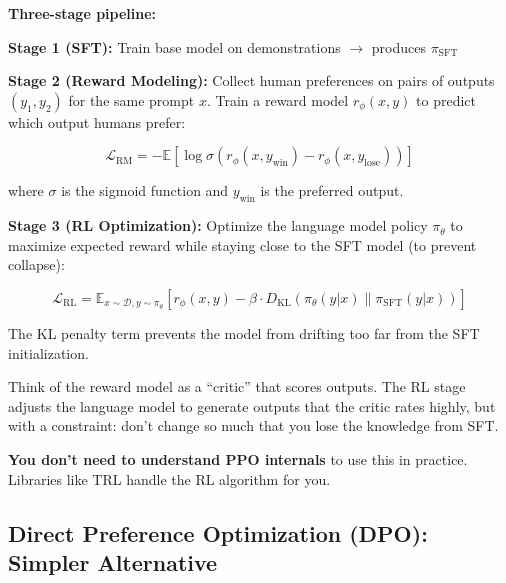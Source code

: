 \documentclass{article}
\begin{document}
\textbf{Three-stage pipeline:}

\begin{center}
\end{center}

\textbf{Stage 1 (SFT):} Train base model on demonstrations $\rightarrow$ produces $\pi_{\text{SFT}}$

\textbf{Stage 2 (Reward Modeling):} Collect human preferences on pairs of outputs $(y_1, y_2)$ for the same prompt $x$. Train a reward model $r_\phi(x, y)$ to predict which output humans prefer:

\begin{equation}
\mathcal{L}_{\text{RM}} = -\mathbb{E} \left[ \log \sigma\left(r_\phi(x, y_{\text{win}}) - r_\phi(x, y_{\text{lose}})\right) \right]
\end{equation}

where $\sigma$ is the sigmoid function and $y_{\text{win}}$ is the preferred output.

\textbf{Stage 3 (RL Optimization):} Optimize the language model policy $\pi_\theta$ to maximize expected reward while staying close to the SFT model (to prevent collapse):

\begin{equation}
\mathcal{L}_{\text{RL}} = \mathbb{E}_{x \sim \mathcal{D}, y \sim \pi_\theta} \left[ r_\phi(x, y) - \beta \cdot D_{\text{KL}}\left(\pi_\theta(y|x) \| \pi_{\text{SFT}}(y|x)\right) \right]
\end{equation}

The KL penalty term prevents the model from drifting too far from the SFT initialization.

\begin{tcolorbox}[colback=blue!5!white, colframe=blue!50!black, title=Intuition Without RL Theory]
Think of the reward model as a ``critic'' that scores outputs. The RL stage adjusts the language model to generate outputs that the critic rates highly, but with a constraint: don't change so much that you lose the knowledge from SFT.

\textbf{You don't need to understand PPO internals} to use this in practice. Libraries like TRL handle the RL algorithm for you.
\end{tcolorbox}

\subsection{Direct Preference Optimization (DPO): Simpler Alternative}
\end{document}
